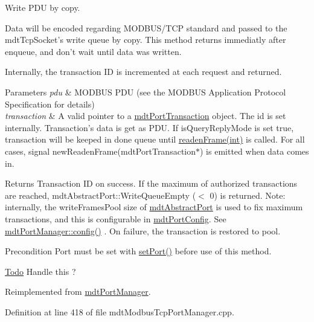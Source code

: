 Write PDU by copy. 

Data will be encoded regarding MODBUS/TCP standard and passed to the mdtTcpSocket's write queue by copy. This method returns immediatly after enqueue, and don't wait until data was written.

Internally, the transaction ID is incremented at each request and returned.


\begin{DoxyParams}{Parameters}
{\em pdu} & MODBUS PDU (see the MODBUS Application Protocol Specification for details) \\
\hline
{\em transaction} & A valid pointer to a \hyperlink{classmdt_port_transaction}{mdtPortTransaction} object. The id is set internally. Transaction's data is get as PDU. If isQueryReplyMode is set true, transaction will be keeped in done queue until \hyperlink{classmdt_port_manager_a830ae182d06dd6a52c43a7f45b9240ac}{readenFrame(int)} is called. For all cases, signal newReadenFrame(mdtPortTransaction$\ast$) is emitted when data comes in. \\
\hline
\end{DoxyParams}
\begin{DoxyReturn}{Returns}
Transaction ID on success. If the maximum of authorized transactions are reached, mdtAbstractPort::WriteQueueEmpty ($<$ 0) is returned. Note: internally, the writeFramesPool size of \hyperlink{classmdt_abstract_port}{mdtAbstractPort} is used to fix maximum transactions, and this is configurable in \hyperlink{classmdt_port_config}{mdtPortConfig}. See \hyperlink{classmdt_port_manager_a9cf3ea2da38f81682695b37448712ffd}{mdtPortManager::config()} . On failure, the transaction is restored to pool. 
\end{DoxyReturn}
\begin{DoxyPrecond}{Precondition}
Port must be set with \hyperlink{classmdt_port_manager_afcd156b2d0c9d340999935efb6cd8cb6}{setPort()} before use of this method. 
\end{DoxyPrecond}


\begin{Desc}
\item[\hyperlink{todo__todo000017}{Todo}]Handle this ? \end{Desc}




Reimplemented from \hyperlink{classmdt_port_manager_a328abc7f5f2677c19ea11567df6597da}{mdtPortManager}.



Definition at line 418 of file mdtModbusTcpPortManager.cpp.

